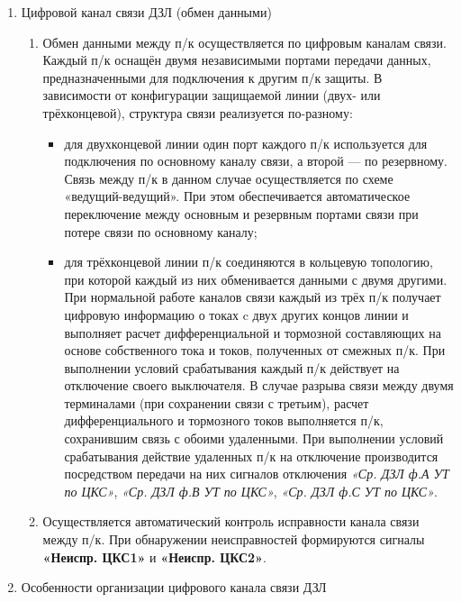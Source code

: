 \begin{enumerate}
\item Цифровой канал связи ДЗЛ (обмен данными)
\begin{enumerate}
\item Обмен данными между п/к осуществляется по цифровым каналам связи. Каждый п/к оснащён двумя независимыми портами передачи данных, предназначенными для подключения к другим п/к защиты. В зависимости от конфигурации защищаемой линии (двух- или трёхконцевой), структура связи реализуется по-разному:
  \begin{itemize}
    \item для двухконцевой линии один порт каждого п/к используется для подключения по основному каналу связи, а второй — по резервному. Связь между п/к в данном случае осуществляется по схеме «ведущий-ведущий». При этом обеспечивается автоматическое переключение между основным и резервным портами связи при потере связи по основному каналу;
    \item для трёхконцевой линии п/к соединяются в кольцевую топологию, при которой каждый из них обменивается данными с двумя другими. При нормальной работе каналов связи каждый из трёх п/к получает цифровую информацию о токах c двух других концов линии и выполняет расчет дифференциальной и тормозной составляющих на основе собственного тока и токов, полученных от смежных п/к. При выполнении условий срабатывания каждый п/к действует на отключение своего выключателя. В случае разрыва связи между двумя терминалами (при сохранении связи с третьим), расчет дифференциального и тормозного токов выполняется п/к, сохранившим связь с обоими удаленными. При выполнении условий срабатывания действие удаленных п/к на отключение производится посредством передачи на них сигналов отключения \textit{«Ср. ДЗЛ ф.А УТ по ЦКС»}, \textit{«Ср. ДЗЛ ф.В УТ по ЦКС»}, \textit{«Ср. ДЗЛ ф.С УТ по ЦКС»}.
  \end{itemize}
\item Осуществляется автоматический контроль исправности канала связи между п/к. При обнаружении неисправностей формируются сигналы \textbf{«Неиспр. ЦКС1»} и \textbf{«Неиспр. ЦКС2»}.
\end{enumerate}

\item Особенности организации цифрового канала связи ДЗЛ


\end{enumerate}
